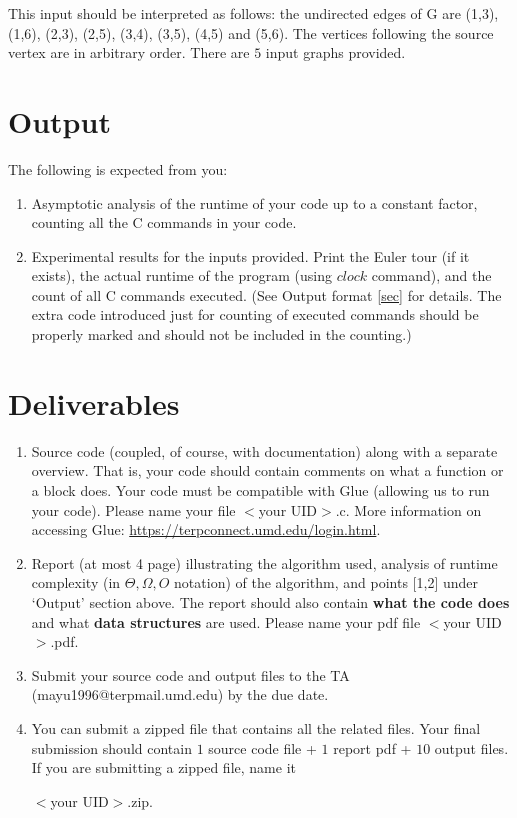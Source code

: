 \documentclass{article}
\begin{document}
This input should be interpreted as follows: the undirected edges of G are (1,3), (1,6), (2,3), (2,5), (3,4), (3,5), (4,5) and (5,6). The vertices following the source vertex are in arbitrary order. There are $5$ input graphs provided.

\section{Output}
The following is expected from you:
\begin{enumerate}
  \item Asymptotic analysis of the runtime of your code up to a constant factor, counting all the C commands in your code.
  \item Experimental results for the inputs provided. Print the Euler tour (if it exists), the actual runtime of the program (using $clock$ command), and the count of all C commands executed. (See Output format \ref{sec} for details. The extra code introduced just for counting of executed commands should be properly marked and should not be included in the counting.)
\end{enumerate}

\section{Deliverables}
\begin{enumerate}
  \item Source code (coupled, of course, with documentation) along with a separate overview. That is, your code should contain comments on what a function or a block does. Your code must be compatible with Glue (allowing us to run your code). Please name your file $<$your UID$>$.c. More information on accessing Glue: \url{https://terpconnect.umd.edu/login.html}.
  \item Report (at most 4 page) illustrating the algorithm used, analysis of runtime complexity (in $\Theta, \Omega, O$ notation) of the algorithm, and points [1,2] under `Output' section above. The report should also contain \textbf{what the code does} and what \textbf{data structures} are used. Please name your pdf file $<$your UID$>$.pdf.
  \item Submit your source code and output files to the TA (mayu1996@terpmail.umd.edu) by the due date.
  \item You can submit a zipped file that contains all the related files. Your final submission should contain $1$ source code file + $1$ report pdf + $10$ output files. If you are submitting a zipped file, name it

  $<$your UID$>$.zip.
\end{enumerate}
\end{document}
